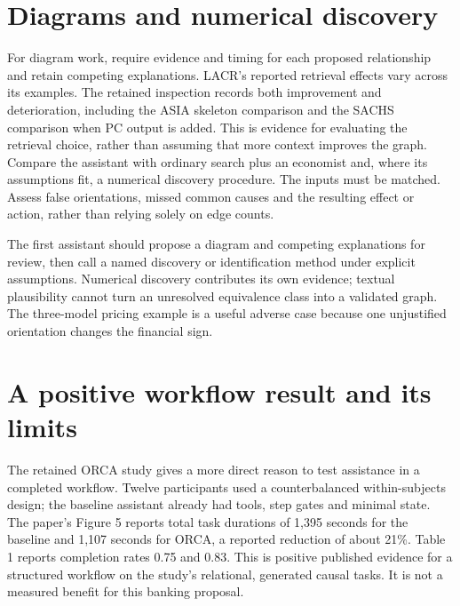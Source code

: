 


\section{Diagrams and numerical discovery}
For diagram work, require evidence and timing for each proposed relationship
and retain competing explanations. LACR's reported retrieval effects vary
across its examples. The retained inspection records both improvement and
deterioration, including the ASIA skeleton comparison and the SACHS
comparison when PC output is added. This is evidence for evaluating the
retrieval choice, rather than assuming that more context improves the graph.
\citep{v12_la_2402_15301}
Compare the assistant with ordinary search plus an economist and, where
its assumptions fit, a numerical discovery procedure. The inputs must
be matched. Assess false orientations, missed common causes and the
resulting effect or action, rather than relying solely on edge counts.

The first assistant should propose a diagram and competing explanations
for review, then call a named discovery or identification method under
explicit assumptions. Numerical discovery contributes its own evidence;
textual plausibility cannot turn an unresolved equivalence class into
a validated graph. The three-model pricing example is a useful adverse
case because one unjustified orientation changes the financial sign.



\section{A positive workflow result and its limits}
The retained ORCA study gives a more direct reason to test assistance in a
completed workflow. Twelve participants used a counterbalanced within-subjects
design; the baseline assistant already had tools, step gates and minimal
state. The paper's Figure 5 reports total task durations of 1,395 seconds
for the baseline and 1,107 seconds for ORCA, a reported reduction of about
21\%. Table 1 reports completion rates 0.75 and 0.83. This is positive
published evidence for a structured workflow on the study's relational,
generated causal tasks. It is not a measured benefit for this banking
proposal. \citep[pp.~3--5]{exec13_census_orca}


